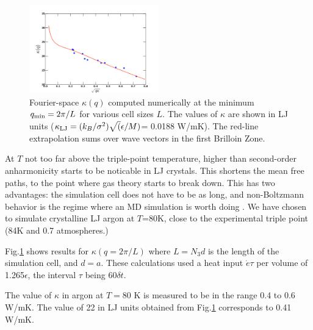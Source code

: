 \documentclass[aps,prb,twocolumn,showpacs,superscriptaddress]{revtex4-1}\begin{tiny}\end{tiny}
\begin{document}
{\par
\begin{figure}[top]
\includegraphics[angle=0,width=0.5\textwidth]{test11.pdf}%
\caption{\label{fig:error1} Fourier-space $\kappa(q)$ computed numerically
at the minimum $q_{\rm min}=2\pi/L$ for various cell sizes $L$.  The values
of $\kappa$ are shown in LJ units ($\kappa_{\rm LJ}=(k_B/\sigma^2)\sqrt(\epsilon/M)$=
0.0188 W/mK). The red-line extrapolation sums over wave vectors in the first Brilloin Zone.}
\label{fig:error1}
\end{figure}
\par

At $T$ not too far above the
triple-point temperature, higher than second-order anharmonicity starts to be
noticable in LJ crystals.
This shortens the mean free paths, to the point where gas theory starts to break down.  
This has two advantages: the simulation cell does not have to be as long, and
non-Boltzmann behavior is the regime where an MD simulation is worth doing .
We have chosen to simulate crystalline LJ argon at $T$=80K, close to the experimental
triple point (84K and 0.7 atmospheres.)

Fig.\ref{fig:error1} shows results for $\kappa(q=2\pi/L)$ where $L=N_3d$ is the
length of the simulation cell, and $d=a$.  These calculations used a heat input ${\dot e}\tau$ per volume of 1.265$\epsilon$, the interval $\tau$ being $60\delta t$.

The value of $\kappa$ in argon at $T=$80 K is measured \cite{Clayton} to be in the
range 0.4 to 0.6 W/mK.  The value of
22 in LJ units obtained from Fig.\ref{fig:error1} corresponds to 0.41 W/mK.
%
%
%
\begin{appendix}

\end{appendix}}
\end{document}
